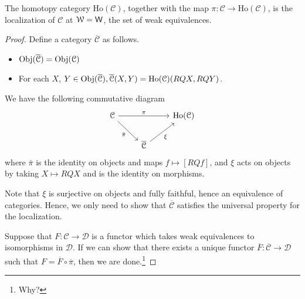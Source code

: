 \documentclass[main.tex]{subfiles}
\begin{document}
\begin{theorem}
  The homotopy category $\mathrm{Ho}(\mathcal{C})$, together with the map $\pi\colon \mathcal{C} \to \mathrm{Ho}(\mathcal{C})$, is the localization of $\mathcal{C}$ at $\mathcal{W} = \mathsf{W}$, the set of weak equivalences.
\end{theorem}
\begin{proof}
  Define a category $\overline{\mathcal{C}}$ as follows.
  \begin{itemize}
    \item $\operatorname{Obj}(\overline{\mathcal{C}}) = \operatorname{Obj}(\mathcal{C})$

    \item For each $X$, $Y \in \operatorname{Obj}(\overline{\mathcal{C}}), \overline{\mathcal{C}}(X, Y) = \mathrm{Ho}(\mathcal{C})(RQX, RQY)$.
  \end{itemize}

  We have the following commutative diagram
  \begin{equation*}
    \begin{tikzcd}
      \mathcal{C}
      \arrow[rr, "\pi"]
      \arrow[dr, swap, "\bar{\pi}"]
      && \mathrm{Ho}(\mathcal{C})
      \\
      & \overline{\mathcal{C}}
      \arrow[ur, swap, "\xi"]
    \end{tikzcd}
  \end{equation*}
  where $\bar{\pi}$ is the identity on objects and maps $f \mapsto [RQf]$, and $\xi$ acts on objects by taking $X \mapsto RQX$ and is the identity on morphisms.

  Note that $\xi$ is surjective on objects and fully faithful, hence an equivalence of categories. Hence, we only need to show that $\overline{\mathcal{C}}$ satisfies the universal property for the localization.

  Suppose that $F\colon \mathcal{C} \to \mathcal{D}$ is a functor which takes weak equivalences to isomorphisms in $\mathcal{D}$. If we can show that there exists a unique functor $\overline{F}\colon \overline{\mathcal{C}} \to \mathcal{D}$ such that $F = \overline{F} \circ \overline{\pi}$, then we are done.\footnote{Why?}


\end{proof}
\end{document}
